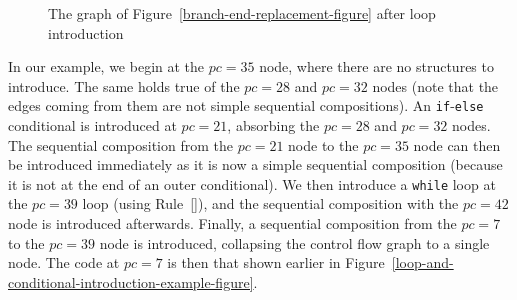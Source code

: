 \begin{figure}
  \begin{center}
  \end{center}
  \caption{The graph of Figure~\ref{branch-end-replacement-figure} after loop introduction}
  \label{branch-end-reduction-figure}
\end{figure}

In our example, we begin at the $pc=35$ node, where there are no
structures to introduce. 
The same holds true of the $pc=28$ and $pc=32$ nodes (note that the
edges coming from them are not simple sequential compositions).
An \texttt{if}-\texttt{else} conditional is introduced at $pc=21$,
absorbing the $pc=28$ and $pc=32$ nodes.
The sequential composition from the $pc=21$ node to the $pc=35$ node
can then be introduced immediately as it is now a simple sequential
composition (because it is not at the end of an outer conditional).
We then introduce a \texttt{while} loop at the $pc=39$ loop (using
Rule~[]), and the sequential
composition with the $pc=42$ node is introduced afterwards.
Finally, a sequential composition from the $pc=7$ to the $pc=39$ node
is introduced, collapsing the control flow graph to a single node.
The code at $pc=7$ is then that shown earlier in
Figure~\ref{loop-and-conditional-introduction-example-figure}.